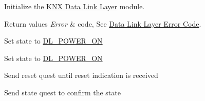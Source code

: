 Initialize the \hyperlink{group___k_n_x___d_l}{K\+NX Data Link Layer} module. 


\begin{DoxyRetVals}{Return values}
{\em Error} & code, See \hyperlink{group___d_l___error___code}{Data Link Layer Error Code}. \\
\hline
\end{DoxyRetVals}
Set state to \hyperlink{group___k_n_x___d_l___exported___types_gga143539be3680d9b7f990a9dfe1df40fea8be7f520654ac8f7854b3caf3b0a5019}{D\+L\+\_\+\+P\+O\+W\+E\+R\+\_\+\+ON}

Set state to \hyperlink{group___k_n_x___d_l___exported___types_gga143539be3680d9b7f990a9dfe1df40fea8be7f520654ac8f7854b3caf3b0a5019}{D\+L\+\_\+\+P\+O\+W\+E\+R\+\_\+\+ON}

Send reset quest until reset indication is received

Send state quest to confirm the state 